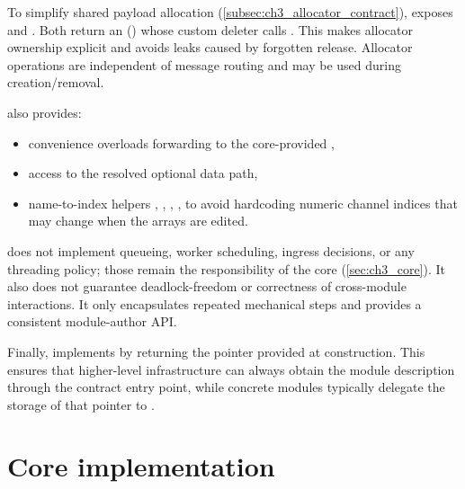 To simplify shared payload allocation (\autoref{subsec:ch3_allocator_contract}),  exposes  and . Both return an  () whose custom deleter calls . This makes allocator ownership explicit and avoids leaks caused by forgotten release. Allocator operations are independent of message routing and may be used during creation/removal.

 also provides:
\begin{itemize}
    \item {} convenience overloads forwarding to the core-provided ,
    \item {} access to the resolved optional data path,
    \item name-to-index helpers , , , , to avoid hardcoding numeric channel indices that may change when the  arrays are edited.
\end{itemize}

 does not implement queueing, worker scheduling, ingress decisions, or any threading policy; those remain the responsibility of the core (\autoref{sec:ch3_core}). It also does not guarantee deadlock-freedom or correctness of cross-module interactions. It only encapsulates repeated mechanical steps and provides a consistent module-author API.

Finally,  implements  by returning the  pointer provided at construction. This ensures that higher-level infrastructure can always obtain the module description through the contract entry point, while concrete modules typically delegate the storage of that pointer to .





\section{Core implementation} \label{sec:ch3_core}


